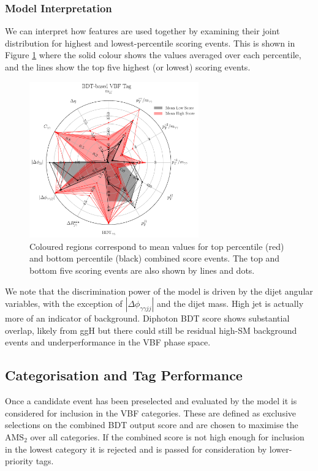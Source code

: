 \subsubsection{Model Interpretation}
We can interpret how features are used together by examining their joint distribution for highest and lowest-percentile scoring events. 
This is shown in Figure \ref{fig:event_categorisaton:bdt_based_vbf_tag_interpretation} where the solid colour shows the values averaged over each percentile, and the lines show the top five highest (or lowest) scoring events.
\begin{figure}[h!]
    \centering
    \includegraphics[width=0.65\textwidth]{figures/event_selection/eng_feature_radar_BDT.pdf}
    \caption{Coloured regions correspond to mean values for top percentile (red) and bottom percentile (black) combined score events. 
             The top and bottom five scoring events are also shown by lines and dots.}
    \label{fig:event_categorisaton:bdt_based_vbf_tag_interpretation}
\end{figure}

We note that the discrimination power of the model is driven by the dijet angular variables, with the exception of $|\Delta\phi_{\gamma\gamma{jj}}|$ and the dijet mass.
High jet \pt is actually more of an indicator of background.
Diphoton BDT score shows substantial overlap, likely from ggH but there could still be residual high-\pt SM background events and underperformance in the VBF phase space.


\subsection{Categorisation and Tag Performance}
Once a candidate event has been preselected and evaluated by the model it is considered for inclusion in the VBF categories. 
These are defined as exclusive selections on the combined BDT output score and are chosen to maximise the $\mathrm{AMS}_2$ over all categories. 
If the combined score is not high enough for inclusion in the lowest category it is rejected and is passed for consideration by lower-priority tags. 

